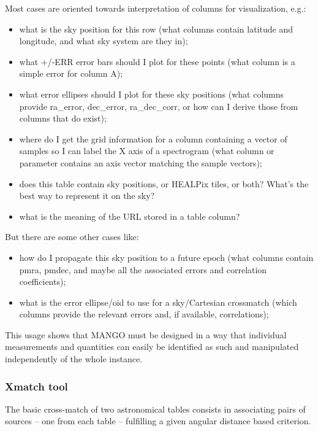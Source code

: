 Most cases are oriented towards interpretation of columns for visualization, e.g.:
\begin{itemize}[noitemsep,topsep=0pt,parsep=0pt,partopsep=0pt]
    \item what is the sky position for this row
    (what columns contain latitude and longitude, and what sky system are they in);

     \item what +/-ERR error bars should I plot for these points
    (what column is a simple error for column A);

    \item what error ellipses should I plot for these sky positions
    (what columns provide ra\_error, dec\_error, ra\_dec\_corr,
     or how can I derive those from columns that do exist);

    \item where do I get the grid information for a column containing
    a vector of samples so I can label the X axis of a spectrogram
    (what column or parameter contains an axis vector matching
     the sample vectors);

    \item does this table contain sky positions, or HEALPix tiles, or both?
    What's the best way to represent it on the sky?

    \item what is the meaning of the URL stored in a table column?
\end{itemize}

But there are some other cases like:

\begin{itemize}[noitemsep,topsep=0pt,parsep=0pt,partopsep=0pt]
    \item how do I propagate this sky position to a future epoch
    (what columns contain pmra, pmdec, and maybe all the
     associated errors and correlation coefficients);

    \item what is the error ellipse/oid to use for a sky/Cartesian crossmatch
    (which columns provide the relevant errors and, if available,
     correlations);
\end{itemize}

This usage shows that MANGO must be designed in a way that individual measurements and quantities
can easily be identified as such and manipulated independently of the whole instance.

\subsubsection{Xmatch tool }
The basic cross-match of two astronomical tables consists in associating pairs of sources -- one 
from each table -- fulfilling a given angular distance based criterion.

